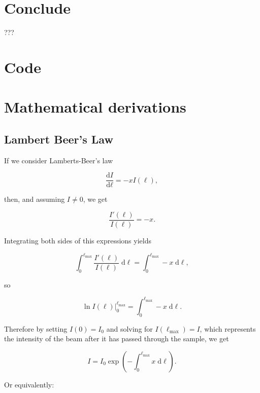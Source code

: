 \documentclass{article}
\newcommand{\diff}[2]{\frac{\text{d} #1}{\text{d} #2}}
\begin{document}
\section{Conclude}
???






\newpage
\appendix
\section{Code}

\section{Mathematical derivations}
\subsection{Lambert Beer's Law}\label{appendix:lambert-beers-law}
If we consider Lamberts-Beer's law

\begin{equation}\label{eq:lamberts-beer}
    \diff{I}{\ell} = -x I(\ell),
\end{equation}

then, and assuming $I \neq 0$, we get

\begin{equation}
    \frac{I'(\ell)}{I(\ell)} = -x.
\end{equation}

Integrating both sides of this expressions yields

\begin{equation}
    \int_{0}^{\ell_{\max}} \frac{I'(\ell)}{I(\ell)} \; \mathrm{d}\ell = \int_{0}^{\ell_{\max}} -x \; \mathrm{d}\ell,
\end{equation}

so

\begin{equation}
    \ln{I(\ell)} \big|_{0}^{\ell_{\max}} = \int_{0}^{\ell_{\max}} -x \; \mathrm{d}\ell.
\end{equation}

Therefore by setting $I(0) = I_0$ and solving for $I(\ell_{\max}) = I$, which represents the intensity of the beam after it has passed through the sample, we get

\begin{equation}
    I = I_0 \exp{\left(-\int_{0}^{\ell_{\max}} x \; \mathrm{d}\ell \right)}.
\end{equation}

Or equivalently:
\end{document}
